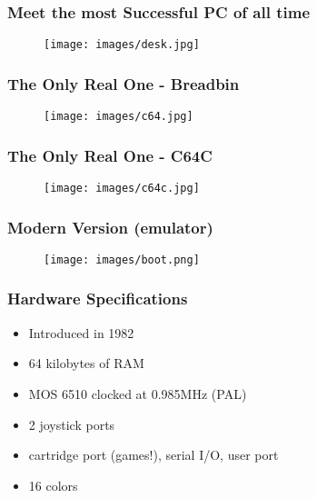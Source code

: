 \documentclass[aspectratio=43]{uva-inf-presentation}
\begin{document}

\begin{frame}
\frametitle{Meet the most Successful PC of all time}

\begin{figure}
\texttt{[image: images/desk.jpg]}
\end{figure}

\end{frame}


\begin{frame}
\frametitle{The Only Real One - Breadbin}

\begin{figure}
\texttt{[image: images/c64.jpg]}
\end{figure}

\end{frame}


\begin{frame}
\frametitle{The Only Real One - C64C}

\begin{figure}
\texttt{[image: images/c64c.jpg]}
\end{figure}

\end{frame}


\begin{frame}
\frametitle{Modern Version (emulator)}

\begin{figure}
\texttt{[image: images/boot.png]}
\end{figure}

\end{frame}


\begin{frame}
\frametitle{Hardware Specifications}

\begin{itemize}
\item Introduced in 1982
\item 64 kilobytes of RAM
\item MOS 6510 clocked at 0.985MHz (PAL)
\item 2 joystick ports
\item cartridge port (games!), serial I/O, user port
\item 16 colors
\end{itemize}

\end{frame}
\end{document}
